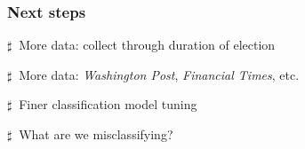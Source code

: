 \documentclass[11pt]{beamer}
\newenvironment{innerlist}[1][\enskip\textbullet]%
        {\begin{compactenum}[#1]}{\end{compactenum}}
\begin{document}

\begin{frame}
\frametitle{Next steps}

\vspace{5mm}

\begin{innerlist}
	\item[$\sharp~$] More data: collect through duration of election
	\vspace{4mm}
	\item[$\sharp~$] More data: {\it Washington Post}, {\it Financial Times}, etc.
	\vspace{4mm}
	\item[$\sharp~$] Finer classification model tuning 
	\vspace{4mm}
	\item[$\sharp~$] What are we misclassifying? 
\end{innerlist}

\end{frame}

\end{document}
